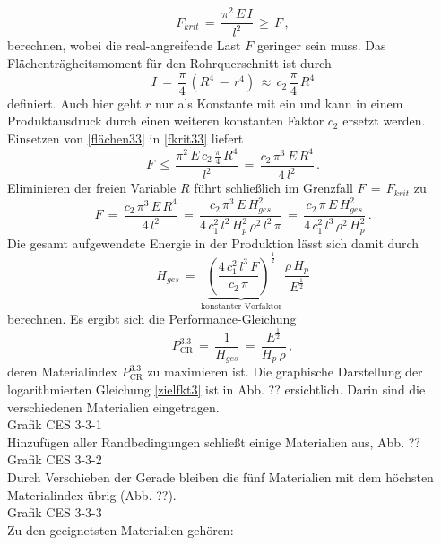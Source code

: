 \begin{equation}\label{fkrit33}
F_{krit}\,=\,\frac{\pi^2\,E\,I}{l^2}\,\ge\,F\,,
\end{equation}
berechnen, wobei die real-angreifende Last $F$ geringer sein muss.
Das Flächenträgheitsmoment für den Rohrquerschnitt ist durch
\begin{equation}\label{flächen33}
I\,=\,\frac{\pi}{4}\,\left(R^4\,-\,r^4\right)\,\approx\,c_2\,\frac{\pi}{4}\,R^4
\end{equation}
definiert. Auch hier geht $r$ nur als Konstante mit ein und kann in einem Produktausdruck durch einen weiteren konstanten Faktor $c_2$ ersetzt werden. Einsetzen von \ref{flächen33} in \ref{fkrit33} liefert
\begin{equation}
F\,\le\,\frac{\pi^2\,E\,c_2\,\frac{\pi}{4}\,R^4}{l^2}\,=\,\frac{c_2\,\pi^3\,E\,R^4}{4\,l^2}\,.
\end{equation}
Eliminieren der freien Variable $R$ führt schließlich im Grenzfall $F\,=\,F_{krit}$ zu
\begin{equation}
F\,=\,\frac{c_2\,\pi^3\,E\,R^4}{4\,l^2}\,=\,\frac{c_2\,\pi^3\,E\,H_{ges}^2}{4\,c_1^2\,l^2\,H_p^2\,\rho^2\,l^2\,\pi}\,=\,\frac{c_2\,\pi\,E\,H_{ges}^2}{4\,c_1^2\,l^3\,\rho^2\,H_p^2}\,.
\end{equation}
Die gesamt aufgewendete Energie in der Produktion lässt sich damit durch
\begin{equation}
H_{ges}\,=\,\underbrace{\left(\frac{4\,c_1^2\,l^3\,F}{c_2\,\pi}\right)^\frac{1}{2}}_{\text{konstanter Vorfaktor}}\,\frac{\rho\,H_p}{E^\frac{1}{2}}
\end{equation}
berechnen.
Es ergibt sich die Performance-Gleichung
\begin{equation} \label{zielfkt3}
P_{\text{CR}}^{3.3}\,=\,\frac{1}{H_{ges}}\,=\,\frac{E^\frac{1}{2}}{H_p\,\rho}\,,
\end{equation}
deren Materialindex $P_{\text{CR}}^{3.3}$ zu maximieren ist. Die graphische Darstellung der logarithmierten Gleichung \ref{zielfkt3} ist in Abb. ?? ersichtlich. Darin sind die verschiedenen Materialien eingetragen.\\
Grafik CES 3-3-1\\
Hinzufügen aller Randbedingungen schließt einige Materialien aus, Abb. ??\\
Grafik CES 3-3-2\\
Durch Verschieben der Gerade bleiben die fünf Materialien mit dem höchsten Materialindex übrig (Abb. ??).\\
Grafik CES 3-3-3\\
Zu den geeignetsten Materialien gehören:
